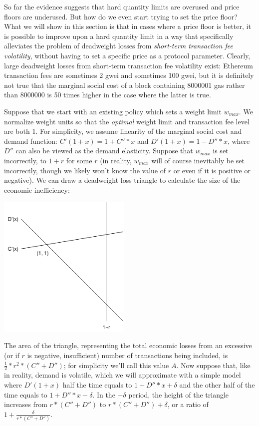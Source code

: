\documentclass[12pt, final]{article}
\begin{document}
So far the evidence suggests that hard quantity limits are overused and price floors are underused. But how do we even start trying to set the price floor? What we will show in this section is that in cases where a price floor is better, it is possible to improve upon a hard quantity limit in a way that specifically alleviates the problem of deadweight losses from \emph{short-term transaction fee volatility}, without having to set a specific price as a protocol parameter. Clearly, large deadweight losses from short-term transaction fee volatility exist: Ethereum transaction fees are sometimes 2 gwei and sometimes 100 gwei, but it is definitely not true that the marginal social cost of a block containing 8000001 gas rather than 8000000 is 50 times higher in the case where the latter is true.

Suppose that we start with an existing policy which sets a weight limit $w_{max}$. We normalize weight units so that the \emph{optimal} weight limit and transaction fee level are both 1. For simplicity, we assume linearity of the marginal social cost and demand function: $C'(1 + x) = 1 + C'' * x$ and $D'(1 + x) = 1 - D'' * x$, where $D''$ can also be viewed as the demand elasticity. Suppose that $w_{max}$ is set incorrectly, to $1 + r$ for some $r$ (in reality, $w_{max}$ will of course inevitably be set incorrectly, though we likely won't know the value of $r$ or even if it is positive or negative). We can draw a deadweight loss triangle to calculate the size of the economic inefficiency:

\begin{center}
\includegraphics[width=2.5in]{Triangle1.png} \\
\end{center}

The area of the triangle, representing the total economic losses from an excessive (or if $r$ is negative, insufficient) number of transactions being included, is $\frac{1}{2} * r^2 * (C'' + D'')$; for simplicity we'll call this value $A$. Now suppose that, like in reality, demand is volatile, which we will approximate with a simple model where $D'(1 + x)$ half the time equals to $1 + D'' * x + \delta$ and the other half of the time equals to $1 + D'' * x - \delta$. In the $-\delta$ period, the height of the triangle increases from $r * (C'' + D'')$ to $r * (C'' + D'') + \delta$, or a ratio of $1 + \frac{\delta}{r * (C'' + D'')}$.
\end{document}
